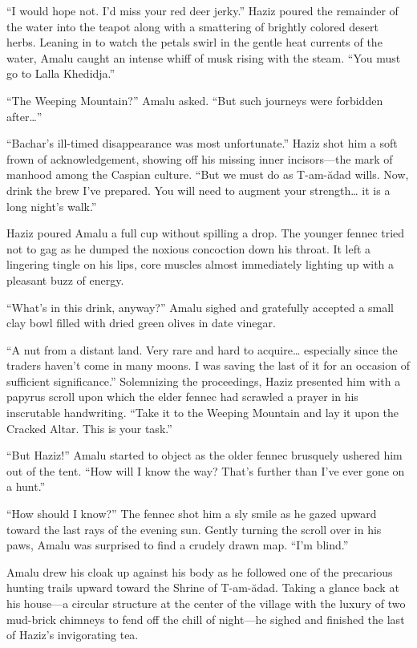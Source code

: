 ``I would hope not. I'd miss your red deer jerky.'' Haziz poured the remainder of the water into the teapot along with a smattering of brightly colored desert herbs. Leaning in to watch the petals swirl in the gentle heat currents of the water, Amalu caught an intense whiff of musk rising with the steam. ``You must go to Lalla Khedidja.''

``The Weeping Mountain?'' Amalu asked. ``But such journeys were forbidden after\ldots''

``Bachar's ill-timed disappearance was most unfortunate.'' Haziz shot him a soft frown of acknowledgement, showing off his missing inner incisors---the mark of manhood among the Caspian culture. ``But we must do as T-am-ădad wills. Now, drink the brew I've prepared. You will need to augment your strength\ldots{} it is a long night's walk.''

Haziz poured Amalu a full cup without spilling a drop. The younger fennec tried not to gag as he dumped the noxious concoction down his throat. It left a lingering tingle on his lips, core muscles almost immediately lighting up with a pleasant buzz of energy.

``What's in this drink, anyway?'' Amalu sighed and gratefully accepted a small clay bowl filled with dried green olives in date vinegar.

``A nut from a distant land. Very rare and hard to acquire\ldots{} especially since the traders haven't come in many moons. I was saving the last of it for an occasion of sufficient significance.'' Solemnizing the proceedings, Haziz presented him with a papyrus scroll upon which the elder fennec had scrawled a prayer in his inscrutable handwriting. ``Take it to the Weeping Mountain and lay it upon the Cracked Altar. This is your task.''

``But Haziz!'' Amalu started to object as the older fennec brusquely ushered him out of the tent. ``How will I know the way? That's further than I've ever gone on a hunt.''

``How should I know?'' The fennec shot him a sly smile as he gazed upward toward the last rays of the evening sun. Gently turning the scroll over in his paws, Amalu was surprised to find a crudely drawn map. ``I'm blind.''

\secdiv

\noindent Amalu drew his cloak up against his body as he followed one of the precarious hunting trails upward toward the Shrine of T-am-ădad. Taking a glance back at his house---a circular structure at the center of the village with the luxury of two mud-brick chimneys to fend off the chill of night---he sighed and finished the last of Haziz's invigorating tea.

